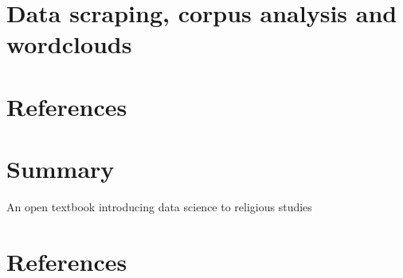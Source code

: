 \documentclass[
  letterpaper,
  DIV=11,
  numbers=noendperiod]{scrreprt}
\newlength{\cslhangindent}
\newlength{\cslentryspacingunit} %
\newenvironment{CSLReferences}[2] %
 {%
  \setlength{\parindent}{0pt}
  \ifodd #1
  \let\oldpar\par
  \def\par{\hangindent=\cslhangindent\oldpar}
  \fi
  \setlength{\parskip}{#2\cslentryspacingunit}
 }%
 {}
\begin{document}

\hypertarget{refs}{}
\begin{CSLReferences}{0}{0}
\end{CSLReferences}


\hypertarget{data-scraping-corpus-analysis-and-wordclouds}{%
\chapter{Data scraping, corpus analysis and
wordclouds}\label{data-scraping-corpus-analysis-and-wordclouds}}


\hypertarget{references-3}{%
\chapter*{References}\label{references-3}}


\hypertarget{refs}{}
\begin{CSLReferences}{0}{0}
\end{CSLReferences}


\hypertarget{summary}{%
\chapter{Summary}\label{summary}}

An open textbook introducing data science to religious studies


\hypertarget{references-4}{%
\chapter*{References}\label{references-4}}


\hypertarget{refs}{}
\begin{CSLReferences}{0}{0}
\end{CSLReferences}
\end{document}
